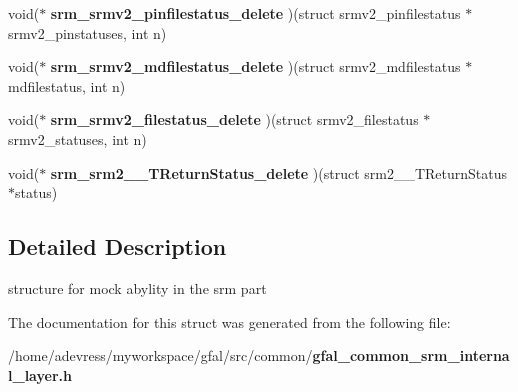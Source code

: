\begin{CompactItemize}
\item 
void($\ast$ \textbf{srm\_\-srmv2\_\-pinfilestatus\_\-delete} )(struct srmv2\_\-pinfilestatus $\ast$srmv2\_\-pinstatuses, int n)\label{struct__gfal__srm__external__call_755de3bb11627d248e340aec4f6db49b}

\item 
void($\ast$ \textbf{srm\_\-srmv2\_\-mdfilestatus\_\-delete} )(struct srmv2\_\-mdfilestatus $\ast$mdfilestatus, int n)\label{struct__gfal__srm__external__call_8334ed4e5c1835eeb209c02d68f39939}

\item 
void($\ast$ \textbf{srm\_\-srmv2\_\-filestatus\_\-delete} )(struct srmv2\_\-filestatus $\ast$srmv2\_\-statuses, int n)\label{struct__gfal__srm__external__call_a3bd168b26c0c5b613f2ebd66d903fb2}

\item 
void($\ast$ \textbf{srm\_\-srm2\_\-\_\-TReturn\-Status\_\-delete} )(struct srm2\_\-\_\-TReturn\-Status $\ast$status)\label{struct__gfal__srm__external__call_d3600d77afae102a47cc323f60da5d3d}

\end{CompactItemize}


\subsection{Detailed Description}
structure for mock abylity in the srm part 



The documentation for this struct was generated from the following file:\begin{CompactItemize}
\item 
/home/adevress/myworkspace/gfal/src/common/\bf{gfal\_\-common\_\-srm\_\-internal\_\-layer.h}\end{CompactItemize}
